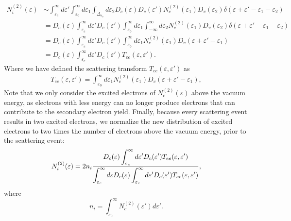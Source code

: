 \begin{refsection}
\begin{equation} 
\begin{aligned} 
N_i^{(2)}(\varepsilon) &\sim \int_{\varepsilon_c}^{\infty} d\varepsilon' 
\int_{\varepsilon_0}^{\infty} d\varepsilon_1 \int_{\Delta_{\varepsilon_v}} 
d\varepsilon_2  D_c(\varepsilon) D_c(\varepsilon') N_c^{(2)}(\varepsilon_1) 
D_v(\varepsilon_2)  \delta(\varepsilon + \varepsilon' -\varepsilon_1 - 
\varepsilon_2) \\ 
&= D_c(\varepsilon) \int_{\varepsilon_c}^{\infty} d\varepsilon' 
D_c(\varepsilon') \int_{\varepsilon_0}^{\infty} d\varepsilon_1 
\int_{-\infty}^{\infty} d\varepsilon_2 N_c^{(2)}(\varepsilon_1) 
D_v(\varepsilon_2)  \delta(\varepsilon + \varepsilon' -\varepsilon_1 - 
\varepsilon_2) \\ 
&= D_c(\varepsilon) \int_{\varepsilon_c}^{\infty} d\varepsilon' 
D_c(\varepsilon') \int_{\varepsilon_0}^{\infty} d\varepsilon_1 
N_c^{(2)}(\varepsilon_1) D_v(\varepsilon + \varepsilon' - \varepsilon_1) \\ 
&= D_c(\varepsilon) \int_{\varepsilon_c}^{\infty} d\varepsilon' 
D_c(\varepsilon') T_{ee}(\varepsilon, \varepsilon'). 
\end{aligned} 
\end{equation} 
Where we have defined the scattering transform $T_{ee}(\varepsilon, 
\varepsilon')$ as 
\begin{equation} 
\begin{aligned} 
T_{ee}(\varepsilon, \varepsilon') = \int_{\varepsilon_0}^{\infty} 
d\varepsilon_1 N_c^{(2)}(\varepsilon_1) D_v(\varepsilon + \varepsilon' - 
\varepsilon_1), 
\end{aligned} 
\end{equation} 
Note that we only consider the excited electrons of $N_c^{(2)}(\varepsilon)$ 
above the vacuum energy, as electrons with less energy can no longer produce 
electrons that can contribute to the secondary electron yield. Finally, 
because every scattering event results in two excited electrons, we normalize 
the new distribution of excited electrons to two times the number of electrons 
above the vacuum energy, prior to the scattering event: 
\begin{equation} 
N_i^{(2)}(\varepsilon) = 2 n_i \frac{\displaystyle D_c(\varepsilon) 
\int_{\varepsilon_c}^{\infty} d\varepsilon' D_c(\varepsilon') 
T_{ee}(\varepsilon, \varepsilon')}{\displaystyle \int_{\varepsilon_c}^{\infty} d\varepsilon 
D_c(\varepsilon) \int_{\varepsilon_c}^{\infty} d\varepsilon' D_c(\varepsilon') 
T_{ee}(\varepsilon, \varepsilon')}, 
\end{equation} 
where 
\begin{equation} 
n_i = \int_{\varepsilon_0}^{\infty} N_c^{(2)} (\varepsilon') d\varepsilon'. 
\end{equation} 
 

\end{refsection}
